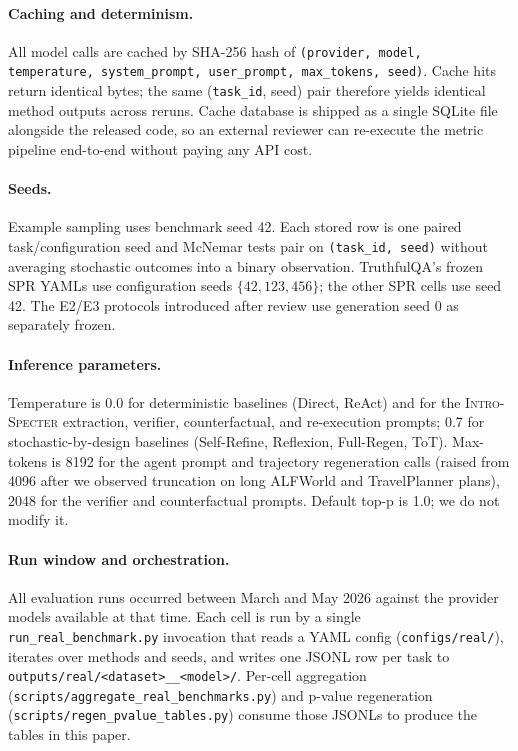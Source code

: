 \documentclass{article}
\newcommand{\method}{\textsc{Intro-Specter}\xspace}
\begin{document}
\paragraph{Caching and determinism.} All model calls are cached by SHA-256 hash of \texttt{(provider, model, temperature, system\_prompt, user\_prompt, max\_tokens, seed)}. Cache hits return identical bytes; the same (\texttt{task\_id}, seed) pair therefore yields identical method outputs across reruns. Cache database is shipped as a single SQLite file alongside the released code, so an external reviewer can re-execute the metric pipeline end-to-end without paying any API cost.

\paragraph{Seeds.} Example sampling uses benchmark seed 42. Each stored row is one paired task/configuration seed and McNemar tests pair on \texttt{(task\_id, seed)} without averaging stochastic outcomes into a binary observation. TruthfulQA's frozen SPR YAMLs use configuration seeds $\{42,123,456\}$; the other SPR cells use seed 42. The E2/E3 protocols introduced after review use generation seed 0 as separately frozen.

\paragraph{Inference parameters.} Temperature is 0.0 for deterministic baselines (Direct, ReAct) and for the \method extraction, verifier, counterfactual, and re-execution prompts; 0.7 for stochastic-by-design baselines (Self-Refine, Reflexion, Full-Regen, ToT). Max-tokens is 8192 for the agent prompt and trajectory regeneration calls (raised from 4096 after we observed truncation on long ALFWorld and TravelPlanner plans), 2048 for the verifier and counterfactual prompts. Default top-p is 1.0; we do not modify it.

\paragraph{Run window and orchestration.} All evaluation runs occurred between March and May 2026 against the provider models available at that time. Each cell is run by a single \texttt{run\_real\_benchmark.py} invocation that reads a YAML config (\texttt{configs/real/}), iterates over methods and seeds, and writes one JSONL row per task to \texttt{outputs/real/<dataset>\_\_<model>/}. Per-cell aggregation (\texttt{scripts/aggregate\_real\_benchmarks.py}) and p-value regeneration (\texttt{scripts/regen\_pvalue\_tables.py}) consume those JSONLs to produce the tables in this paper.
\end{document}

